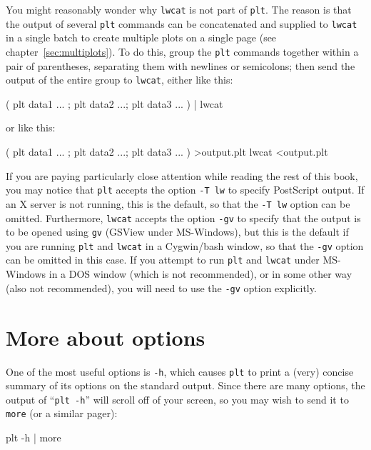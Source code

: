 \documentclass{book}
\begin{document}
\vspace{5mm}
{\small
You might reasonably wonder why {\tt lwcat} is not part of {\tt plt}.  The
reason is that the output of several {\tt plt} commands can be concatenated
and supplied to {\tt lwcat} in a single batch to create multiple plots on
a single page (see chapter~\ref{sec:multiplots}).  To do this,
group the {\tt plt} commands together within a pair of parentheses, separating
them with newlines or semicolons;  then send the output of the entire group
to {\tt lwcat}, either like this:

\begin{center}
\begin{boxedverbatim}
( plt data1 ... ; plt data2 ...; plt data3 ... ) | lwcat
\end{boxedverbatim}
\end{center}

\noindent
or like this:

\begin{center}
\begin{boxedverbatim}
( plt data1 ... ; plt data2 ...; plt data3 ... ) >output.plt
lwcat <output.plt
\end{boxedverbatim}
\end{center}

If you are paying particularly close attention while reading the rest of
this book, you may notice that {\tt plt} accepts the option {\tt -T lw}
to specify PostScript output.  If an X server is not running, this is
the default, so that the {\tt -T lw} option can be omitted.  Furthermore,
{\tt lwcat} accepts the option {\tt -gv} to specify that the output is to
be opened using {\tt gv} (GSView under MS-Windows), but this is the default
if you are running {\tt plt} and {\tt lwcat} in a Cygwin/bash window, so
that the {\tt -gv} option can be omitted in this case.  If you attempt to
run {\tt plt} and {\tt lwcat} under MS-Windows in a DOS window (which is
not recommended), or in some other way (also not recommended), you will need
to use the {\tt -gv} option explicitly.
}%

\section{More about options \label{sec:more-options}}
%
%
%
One of the most useful options is {\tt -h}, which causes {\tt plt} to
print a (very) concise summary of its options on the standard output.
Since there are many options, the output of ``{\tt plt -h}'' will scroll
off of your screen, so you may wish to send it to {\tt more} (or a similar
pager): 
\begin{center}
\begin{boxedverbatim}
plt -h | more
\end{boxedverbatim}
\end{center}
\end{document}
